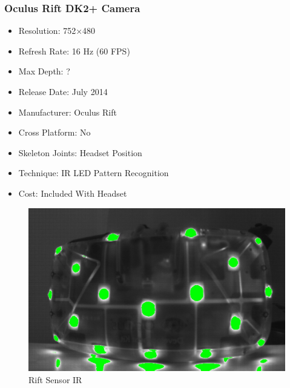 \documentclass[a4paper,10pt]{article}
\begin{document}
\subsubsection{Oculus Rift DK2+ Camera}
\begin{itemize}
  \item Resolution: 752×480
  \item Refresh Rate: 16 Hz (60 FPS)
  \item Max Depth: ?
  \item Release Date: July 2014
  \item Manufacturer: Oculus Rift
  \item Cross Platform: No
  \item Skeleton Joints: Headset Position
  \item Technique: IR LED Pattern Recognition
  \item Cost: Included With Headset
\end{itemize}
\begin{figure}[H]
	\includegraphics[width=\linewidth,height=\paperheight,keepaspectratio]{riftIR.jpg}
	\caption{Rift Sensor IR}
	\label{fig:riftCam}
	\end{figure}
	\pagebreak
\end{document}
